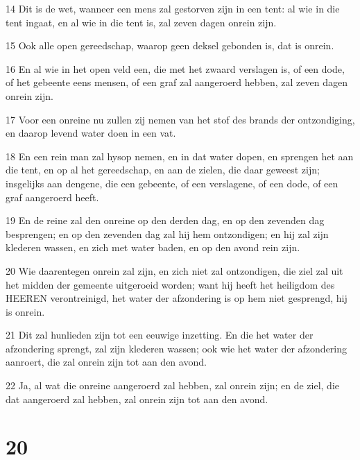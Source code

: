 \par 14 Dit is de wet, wanneer een mens zal gestorven zijn in een tent: al wie in die tent ingaat, en al wie in die tent is, zal zeven dagen onrein zijn.
\par 15 Ook alle open gereedschap, waarop geen deksel gebonden is, dat is onrein.
\par 16 En al wie in het open veld een, die met het zwaard verslagen is, of een dode, of het gebeente eens mensen, of een graf zal aangeroerd hebben, zal zeven dagen onrein zijn.
\par 17 Voor een onreine nu zullen zij nemen van het stof des brands der ontzondiging, en daarop levend water doen in een vat.
\par 18 En een rein man zal hysop nemen, en in dat water dopen, en sprengen het aan die tent, en op al het gereedschap, en aan de zielen, die daar geweest zijn; insgelijks aan dengene, die een gebeente, of een verslagene, of een dode, of een graf aangeroerd heeft.
\par 19 En de reine zal den onreine op den derden dag, en op den zevenden dag besprengen; en op den zevenden dag zal hij hem ontzondigen; en hij zal zijn klederen wassen, en zich met water baden, en op den avond rein zijn.
\par 20 Wie daarentegen onrein zal zijn, en zich niet zal ontzondigen, die ziel zal uit het midden der gemeente uitgeroeid worden; want hij heeft het heiligdom des HEEREN verontreinigd, het water der afzondering is op hem niet gesprengd, hij is onrein.
\par 21 Dit zal hunlieden zijn tot een eeuwige inzetting. En die het water der afzondering sprengt, zal zijn klederen wassen; ook wie het water der afzondering aanroert, die zal onrein zijn tot aan den avond.
\par 22 Ja, al wat die onreine aangeroerd zal hebben, zal onrein zijn; en de ziel, die dat aangeroerd zal hebben, zal onrein zijn tot aan den avond.

\chapter{20}

